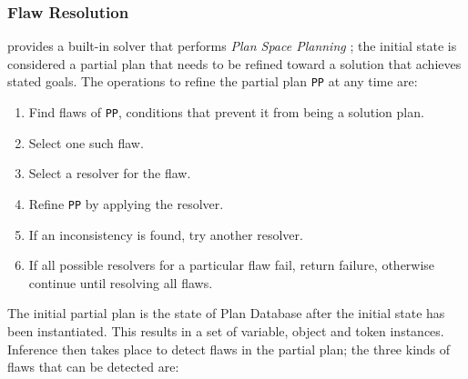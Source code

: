 \subsubsection{Flaw Resolution}
\label{sec:europa:flaws}

\eu provides a built-in solver that performs \emph{Plan Space
  Planning} \cite{ghallab04}; the initial state is considered a
partial plan that needs to be refined toward a solution that achieves
stated goals. The operations to refine the partial plan \texttt{PP} at
any time are:

\begin{enumerate}

\item Find flaws of \texttt{PP}, \ie conditions that prevent it from
  being a solution plan.

\item Select one such flaw.

\item Select a resolver for the flaw.

\item Refine \texttt{PP} by applying the resolver.

\item If an inconsistency is found, try another resolver.

\item If all possible resolvers for a particular flaw fail, return
  failure, otherwise continue until resolving all flaws.

\end{enumerate}
	
The initial partial plan is the state of \eus Plan Database after the
initial state has been instantiated. This results in a set of
variable, object and token instances. Inference then takes place to
detect flaws in the partial plan; the three kinds of flaws that can be
detected are:

